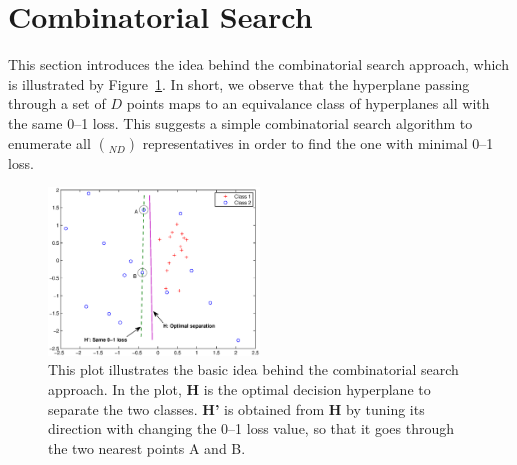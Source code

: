 \section{Combinatorial Search}
\label{cha:combinatorialsearch}

This section introduces the idea behind the combinatorial search
approach, which is illustrated by Figure~\ref{fig:cs_intro}. In short,
we observe that the hyperplane passing through a set of $D$ points
maps to an equivalance class of hyperplanes all with the same 0--1
loss.  This suggests a simple combinatorial search algorithm to
enumerate all $\choose{N}{D}$ representatives in order to find the one
with minimal 0--1 loss.

\begin{figure}[here]
\includegraphics[width=0.50\textwidth]{images/fig41_intro.eps}
\caption{ \footnotesize This plot illustrates the basic idea behind
  the combinatorial search approach. In the plot, {\bf H} is the
  optimal decision hyperplane to separate the two classes. {\bf H'} is
  obtained from {\bf H} by tuning its direction with changing the 0--1
  loss value, so that it goes through the two nearest points A and B.}
\label{fig:cs_intro}
\end{figure}

